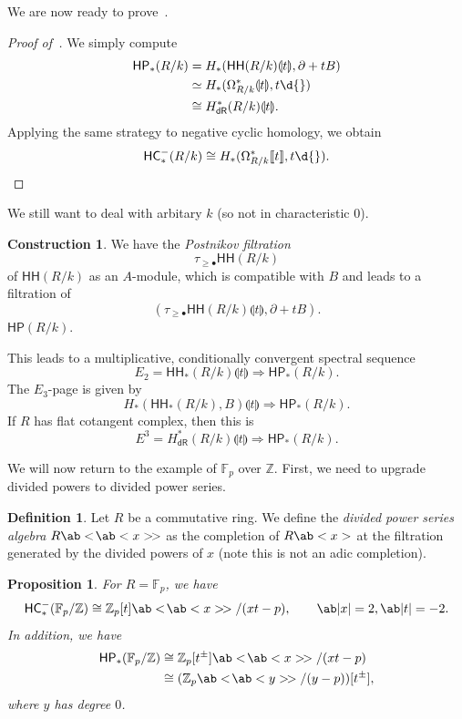 \documentclass[10pt, oneside]{memoir}
\newtheorem{prop}[thm]{Proposition}
\theoremstyle{definition}
\newtheorem{defn}[thm]{Definition}
\newtheorem{con}[thm]{Construction}
\theoremstyle{remark}
\theoremstyle{plain}
\theoremstyle{definition}
\theoremstyle{remark}
\newcommand{\Z}{\mathbb{Z}}
\newcommand{\F}{\mathbb{F}}
\newcommand{\ms}[1]{\mathsf{#1}}
\newcommand{\1}{\mathbf{1}}
\newcommand{\2}{\mathbf{2}}
\newcommand{\3}{\mathbf{3}}
\newcommand{\ps}[1]{\llbracket #1 \rrbracket}
\newcommand{\ls}[1]{\llparenthesis #1 \rrparenthesis}
\newcommand{\dps}[1]{\ab<\!\ab< #1 >\!>}
\newcommand{\HC}{\ms{HC}}
\newcommand{\HH}{\ms{HH}}
\newcommand{\HP}{\ms{HP}}
\newcommand{\dR}{\ms{dR}}
\begin{document}
We are now ready to prove~.
\begin{proof}[Proof of~]
    We simply compute
    \begin{align*}
        \HP_*(R/k) &= H_*(\HH(R/k)\ls{t}, \partial + tB) \\
        &\simeq H_*(\Omega^*_{R/k} \ls{t}, t\d{}) \\
        &\cong H^*_{\dR}(R/k) \ls{t}.
    \end{align*}
    Applying the same strategy to negative cyclic homology, we obtain
    \[ \HC_*^-(R/k) \cong H_*(\Omega^*_{R/k}\ps{t}, t\d{}). \qedhere \]
\end{proof}

We still want to deal with arbitary \(k \) (so not in characteristic \(0 \)). 
\begin{con}
    We have the \textit{Postnikov filtration}
    \[ \tau_{\geq \bullet} \HH(R/k) \]
    of \(\HH(R/k) \) as an \(A \)-module, which is compatible with \(B \) and leads to a filtration of
    \[ (\tau_{\geq \bullet} \HH(R/k)\ls{t}, \partial + tB). \]
    \(\HP(R/k) \). 
\end{con}

This leads to a multiplicative, conditionally convergent spectral sequence
\[ E_2 = \HH_*(R/k) \ls{t} \Longrightarrow \HP_*(R/k). \]
The \(E_3 \)-page is given by
\[ H_*(\HH_*(R/k), B)\ls{t} \Longrightarrow \HP_*(R/k). \]
If \(R \) has flat cotangent complex, then this is
\[ E^3 = H^*_{\dR}(R/k)\ls{t} \Longrightarrow \HP_*(R/k). \]

We will now return to the example of \(\F_p \) over \(\Z \). First, we need to upgrade divided powers to divided power series.

\begin{defn}
    Let \(R \) be a commutative ring. We define the \textit{divided power series algebra} \(R \ab<\!\ab<x>\!> \) as the completion of \(R\ab<x> \) at the filtration generated by the divided powers of \(x \) (note this is not an adic completion).
\end{defn}

\begin{prop}
    For \(R = \F_p \), we have
    \[ \HC_*^-(\F_p/\Z) \cong \Z_p[t]\dps{x} / (xt-p), \qquad \ab|x|=2, \ab|t|=-2. \]
    In addition, we have
    \begin{align*}
        \HP_*(\F_p/\Z) &\cong \Z_p[t^{\pm}] \dps{x} / (xt-p)  \\
        &\cong (\Z_p \dps{y}/(y-p) )[ t^{\pm}],
    \end{align*}
    where \(y \) has degree \(0 \).
\end{prop}
\end{document}
